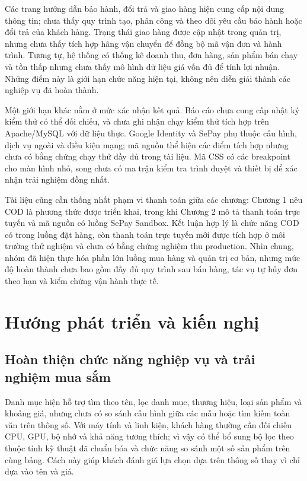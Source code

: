 Các trang hướng dẫn bảo hành, đổi trả và giao hàng hiện cung cấp nội dung thông tin; chưa thấy quy trình tạo, phân công và theo dõi yêu cầu bảo hành hoặc đổi trả của khách hàng. Trạng thái giao hàng được cập nhật trong quản trị, nhưng chưa thấy tích hợp hãng vận chuyển để đồng bộ mã vận đơn và hành trình. Tương tự, hệ thống có thống kê doanh thu, đơn hàng, sản phẩm bán chạy và tồn thấp nhưng chưa thấy mô hình dữ liệu giá vốn đủ để tính lợi nhuận. Những điểm này là giới hạn chức năng hiện tại, không nên diễn giải thành các nghiệp vụ đã hoàn thành.

Một giới hạn khác nằm ở mức xác nhận kết quả. Báo cáo chưa cung cấp nhật ký kiểm thử có thể đối chiếu, và chưa ghi nhận chạy kiểm thử tích hợp trên Apache/MySQL với dữ liệu thực. Google Identity và SePay phụ thuộc cấu hình, dịch vụ ngoài và điều kiện mạng; mã nguồn thể hiện các điểm tích hợp nhưng chưa có bằng chứng chạy thử đầy đủ trong tài liệu. Mã CSS có các breakpoint cho màn hình nhỏ, song chưa có ma trận kiểm tra trình duyệt và thiết bị để xác nhận trải nghiệm đồng nhất.

Tài liệu cũng cần thống nhất phạm vi thanh toán giữa các chương: Chương 1 nêu COD là phương thức được triển khai, trong khi Chương 2 mô tả thanh toán trực tuyến và mã nguồn có luồng SePay Sandbox. Kết luận hợp lý là chức năng COD có trong luồng đặt hàng, còn thanh toán trực tuyến mới được tích hợp ở môi trường thử nghiệm và chưa có bằng chứng nghiệm thu production. Nhìn chung, nhóm đã hiện thực hóa phần lớn luồng mua hàng và quản trị cơ bản, nhưng mức độ hoàn thành chưa bao gồm đầy đủ quy trình sau bán hàng, tác vụ tự hủy đơn theo hạn và kiểm chứng vận hành thực tế.

\section{Hướng phát triển và kiến nghị}

\subsection{Hoàn thiện chức năng nghiệp vụ và trải nghiệm mua sắm}

Danh mục hiện hỗ trợ tìm theo tên, lọc danh mục, thương hiệu, loại sản phẩm và khoảng giá, nhưng chưa có so sánh cấu hình giữa các mẫu hoặc tìm kiếm toàn văn trên thông số. Với máy tính và linh kiện, khách hàng thường cần đối chiếu CPU, GPU, bộ nhớ và khả năng tương thích; vì vậy có thể bổ sung bộ lọc theo thuộc tính kỹ thuật đã chuẩn hóa và chức năng so sánh một số sản phẩm trên cùng bảng. Cách này giúp khách đánh giá lựa chọn dựa trên thông số thay vì chỉ dựa vào tên và giá.

